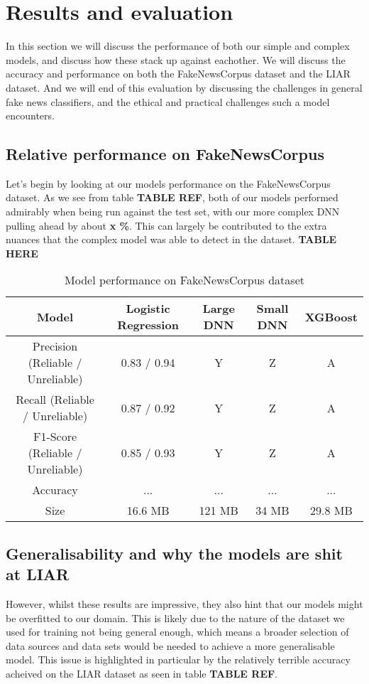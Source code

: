 \section{Results and evaluation}
In this section we will discuss the performance of both our simple and complex models, and discuss how these stack up
against eachother. We will discuss the accuracy and performance on both the FakeNewsCorpus dataset and the LIAR
dataset. And we will end of this evaluation by discussing the challenges in general fake news classifiers, and the
ethical and practical challenges such a model encounters.

\subsection{Relative performance on FakeNewsCorpus}
Let's begin by looking at our models performance on the FakeNewsCorpus dataset. As we see from table \textbf{TABLE REF},
both of our models performed admirably when being run against the test set, with our more complex DNN pulling ahead by
about \textbf{x \%}. This can largely be contributed to the extra nuances that the complex model was able to detect in
the dataset.
\newline
\textbf{TABLE HERE}
\newline

\begin{table}[htpb]
  \centering
  \caption{Model performance on FakeNewsCorpus dataset}
  \label{tab:fakenewsperformance}

  \begin{tabular}{c|cccc}
    Model & Logistic Regression & Large DNN & Small DNN & XGBoost \\ \hline
    Precision (Reliable / Unreliable) & 0.83 / 0.94 & Y & Z & A \\ \hline
    Recall (Reliable / Unreliable) & 0.87 / 0.92 & Y & Z & A \\ \hline
    F1-Score (Reliable / Unreliable) & 0.85 / 0.93 & Y & Z & A \\ \hline
    Accuracy & ... & ... & ... & ... \\ \hline
    Size & 16.6 MB & 121 MB & 34 MB & 29.8 MB 
  \end{tabular}
\end{table}

\subsection{Generalisability and why the models are shit at LIAR}
However, whilst these results are impressive, they also hint that our models might be overfitted to our domain. This is
likely due to the nature of the dataset we used for training not being general enough, which means a broader selection
of data sources and data sets would be needed to achieve a more generalisable model. This issue is highlighted in
particular by the relatively terrible accuracy acheived on the LIAR dataset as seen in table \textbf{TABLE REF}.

